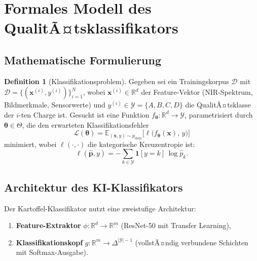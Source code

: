 ﻿\documentclass[12pt,a4paper]{article}
\theoremstyle{plain}
\theoremstyle{definition}
\newtheorem{definition}[theorem]{Definition}
\begin{document}
	\section{Formales Modell des QualitÃ¤tsklassifikators}
	
	\subsection{Mathematische Formulierung}
	
	\begin{definition}[Klassifikationsproblem]
		Gegeben sei ein Trainingskorpus
		$\mathcal{D}$ mit $\mathcal{D} = \{(\mathbf{x}^{(i)}, y^{(i)})\}_{i=1}^{N}$,
		wobei $\mathbf{x}^{(i)} \in \mathbb{R}^d$ der Feature-Vektor
		(NIR-Spektrum, Bildmerkmale, Sensorwerte) und
		$y^{(i)} \in \mathcal{Y} = \{A, B, C, D\}$ die QualitÃ¤tsklasse der
		$i$-ten Charge ist. Gesucht ist eine Funktion
		$f_{\boldsymbol{\theta}} : \mathbb{R}^d \to \mathcal{Y}$,
		parametrisiert durch $\boldsymbol{\theta} \in \Theta$, die den
		erwarteten Klassifikationsfehler
		\[
		\mathcal{L}(\boldsymbol{\theta}) =
		\mathbb{E}_{(\mathbf{x}, y) \sim p_{\mathrm{data}}}
		\bigl[\ell\bigl(f_{\boldsymbol{\theta}}(\mathbf{x}),\, y\bigr)\bigr]
		\]
		minimiert, wobei $\ell(\cdot,\cdot)$ die kategorische Kreuzentropie ist:
		\[
		\ell(\hat{\mathbf{p}}, y) = -\sum_{k \in \mathcal{Y}}
		\mathbf{1}[y=k]\,\log\hat{p}_k.
		\]
	\end{definition}
	
	\subsection{Architektur des KI-Klassifikators}
	
	Der Kartoffel-Klassifikator nutzt eine zweistufige Architektur:
	
	\begin{enumerate}
		\item \textbf{Feature-Extraktor} $\phi : \mathbb{R}^d \to \mathbb{R}^m$
		(ResNet-50 \cite{he2016} mit Transfer Learning),
		\item \textbf{Klassifikationskopf} $g : \mathbb{R}^m \to \Delta^{|\mathcal{Y}|-1}$
		(vollstÃ¤ndig verbundene Schichten mit Softmax-Ausgabe).
	\end{enumerate}
	
\end{document}
